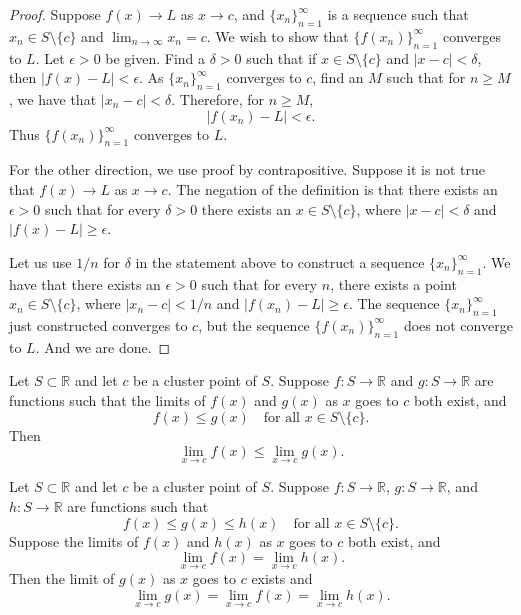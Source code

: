 \documentclass[../main.tex]{subfiles}
\begin{document}
    \begin{proof}
        Suppose $f(x) \to L$ as $x \to c$, and $\{x_n\}_{n=1}^{\infty}$ is a sequence such that $x_n \in S \setminus \{c\}$ and $\lim_{n\to\infty} x_n = c$. We wish to show that $\{f(x_n)\}_{n=1}^{\infty}$ converges to $L$. Let $\epsilon > 0$ be given. Find a $\delta > 0$ such that if $x \in S \setminus \{c\}$ and $|x - c| < \delta$, then $|f(x) - L| < \epsilon$. As $\{x_n\}_{n=1}^{\infty}$ converges to $c$, find an $M$ such that for $n \geq M$, we have that $|x_n - c| < \delta$. Therefore, for $n \geq M$,
        \[
        |f(x_n) - L| < \epsilon.
        \]
        Thus $\{f(x_n)\}_{n=1}^{\infty}$ converges to $L$.
        
        For the other direction, we use proof by contrapositive. Suppose it is not true that $f(x) \to L$ as $x \to c$. The negation of the definition is that there exists an $\epsilon > 0$ such that for every $\delta > 0$ there exists an $x \in S \setminus \{c\}$, where $|x - c| < \delta$ and $|f(x) - L| \geq \epsilon$.
        
        Let us use $1/n$ for $\delta$ in the statement above to construct a sequence $\{x_n\}_{n=1}^{\infty}$. We have that there exists an $\epsilon > 0$ such that for every $n$, there exists a point $x_n \in S \setminus \{c\}$, where $|x_n - c| < 1/n$ and $|f(x_n) - L| \geq \epsilon$. The sequence $\{x_n\}_{n=1}^{\infty}$ just constructed converges to $c$, but the sequence $\{f(x_n)\}_{n=1}^{\infty}$ does not converge to $L$. And we are done. 
    \end{proof}
        
    
    
    
    \begin{proposition}
        Let $S \subset \mathbb{R}$ and let $c$ be a cluster point of $S$. Suppose $f : S \to \mathbb{R}$ and $g : S \to \mathbb{R}$ are functions such that the limits of $f(x)$ and $g(x)$ as $x$ goes to $c$ both exist, and
        \[
        f(x) \leq g(x) \quad \text{for all } x \in S \setminus \{c\}.
        \]
        Then
        \[
        \lim_{x\to c} f(x) \leq \lim_{x\to c} g(x).
        \]
    \end{proposition}
        
    \begin{proposition}
        Let $S \subset \mathbb{R}$ and let $c$ be a cluster point of $S$. Suppose $f : S \to \mathbb{R}$, $g : S \to \mathbb{R}$, and $h : S \to \mathbb{R}$ are functions such that
        \[
        f(x) \leq g(x) \leq h(x) \quad \text{for all } x \in S \setminus \{c\}.
        \]
        Suppose the limits of $f(x)$ and $h(x)$ as $x$ goes to $c$ both exist, and
        \[
        \lim_{x\to c} f(x) = \lim_{x\to c} h(x).
        \]
        Then the limit of $g(x)$ as $x$ goes to $c$ exists and
        \[
        \lim_{x\to c} g(x) = \lim_{x\to c} f(x) = \lim_{x\to c} h(x).
        \]
    \end{proposition}
        
\end{document}
